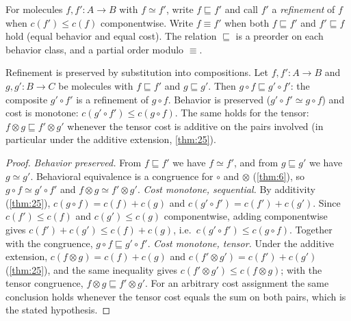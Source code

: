 \begin{definition}[Refinement]\label{def:refine}
For molecules $f, f' \colon A \to B$ with $f \simeq f'$, write
$f \sqsubseteq f'$ and call $f'$ a \emph{refinement} of $f$ when
$c (f') \le c (f)$ componentwise. Write $f \equiv f'$ when both
$f \sqsubseteq f'$ and $f' \sqsubseteq f$ hold (equal behavior and equal
cost). The relation $\sqsubseteq$ is a preorder on each behavior class, and a
partial order modulo $\equiv$.
\end{definition}

\begin{theorem}\label{thm:28}
 Refinement is preserved by substitution into compositions.
Let $f, f' \colon A \to B$ and $g, g' \colon B \to C$ be molecules with
$f \sqsubseteq f'$ and $g \sqsubseteq g'$. Then $g \circ f \sqsubseteq
g' \circ f'$: the composite $g' \circ f'$ is a refinement of $g \circ f$.
Behavior is preserved ($g' \circ f' \simeq g \circ f$) and cost is
monotone: $c (g' \circ f') \le c (g \circ f)$. The same holds for the tensor:
$f \otimes g \sqsubseteq f' \otimes g'$ whenever the tensor cost is additive on
the pairs involved (in particular under the additive extension, \autoref{thm:25}).
\end{theorem}

\begin{proof}
\emph{Behavior preserved.} From $f \sqsubseteq f'$ we have $f \simeq f'$, and
from $g \sqsubseteq g'$ we have $g \simeq g'$. Behavioral equivalence is a
congruence for $\circ$ and $\otimes$ (\autoref{thm:6}), so $g \circ f \simeq g' \circ f'$
and $f \otimes g \simeq f' \otimes g'$.
\emph{Cost monotone, sequential.} By additivity (\autoref{thm:25}),
$c (g \circ f) = c (f) + c (g)$ and $c (g' \circ f') = c (f') + c (g')$. Since
$c (f') \le c (f)$ and $c (g') \le c (g)$ componentwise, adding componentwise
gives $c (f') + c (g') \le c (f) + c (g)$, i.e.\ $c (g' \circ f') \le
c (g \circ f)$. Together with the congruence, $g \circ f \sqsubseteq
g' \circ f'$.
\emph{Cost monotone, tensor.} Under the additive extension,
$c (f \otimes g) = c (f) + c (g)$ and $c (f' \otimes g') = c (f') + c (g')$ (\autoref{thm:25}),
and the same inequality gives $c (f' \otimes g') \le c (f \otimes g)$; with the
tensor congruence, $f \otimes g \sqsubseteq f' \otimes g'$. For an arbitrary
cost assignment the same conclusion holds whenever the tensor cost equals the
sum on both pairs, which is the stated hypothesis.
\end{proof}

